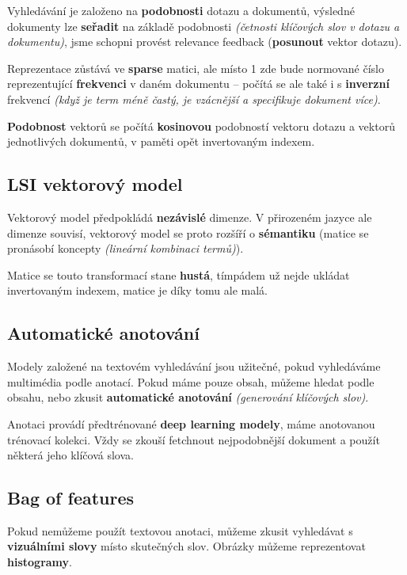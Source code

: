 Vyhledávání je založeno na \textbf{podobnosti} dotazu a dokumentů, výsledné dokumenty lze \textbf{seřadit} na základě podobnosti \textit{(četnosti klíčových slov v dotazu a dokumentu)}, jsme schopni provést relevance feedback (\textbf{posunout} vektor dotazu).

Reprezentace zůstává ve \textbf{sparse} matici, ale místo 1 zde bude normované číslo reprezentující \textbf{frekvenci} v daném dokumentu -- počítá se ale také i s \textbf{inverzní} frekvencí \textit{(když je term méně častý, je vzácnější a specifikuje dokument více)}.

\textbf{Podobnost} vektorů se počítá \textbf{kosinovou} podobností vektoru dotazu a vektorů jednotlivých dokumentů, v paměti opět invertovaným indexem.

\subsection{LSI vektorový model}

Vektorový model předpokládá \textbf{nezávislé} dimenze. V přirozeném jazyce ale dimenze souvisí, vektorový model se proto rozšíří o \textbf{sémantiku} (matice se pronásobí koncepty \textit{(lineární kombinaci termů)}).

Matice se touto transformací stane \textbf{hustá}, tímpádem už nejde ukládat invertovaným indexem, matice je díky tomu ale malá.

\subsection{Automatické anotování}

Modely založené na textovém vyhledávání jsou užitečné, pokud vyhledáváme multimédia podle anotací. Pokud máme pouze obsah, můžeme hledat podle obsahu, nebo zkusit \textbf{automatické anotování} \textit{(generování klíčových slov)}.

Anotaci provádí předtrénované \textbf{deep learning modely}, máme anotovanou trénovací kolekci. Vždy se zkouší fetchnout nejpodobnější dokument a použít některá jeho klíčová slova.

\subsection{Bag of features}

Pokud nemůžeme použít textovou anotaci, můžeme zkusit vyhledávat s \textbf{vizuálními slovy} místo skutečných slov. Obrázky můžeme reprezentovat \textbf{histogramy}.

